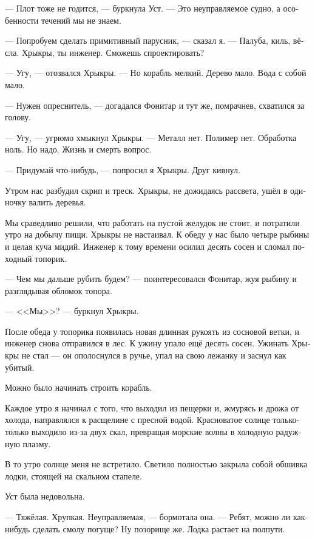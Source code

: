 \documentclass[a4paper,12pt,fleqn]{book}\usepackage{polyglossia}\setdefaultlanguage[babelshorthands=true]{russian}\setotherlanguage{english}\defaultfontfeatures{Ligatures=TeX,Mapping=tex-text}
\newcommand{\asterism}{\vspace{1em}{\centering\Large\bfseries$\ast~\ast~\ast$\par}\vspace{1em}}
\begin{document}
--- Плот тоже не годится, --- буркнула Уст.
--- Это неуправляемое судно, а особенности течений мы не знаем.

--- Попробуем сделать примитивный парусник, --- сказал я.
--- Палуба, киль, вёсла.
Хрыкры, ты инженер.
Сможешь спроектировать?

--- Угу, --- отозвался Хрыкры.
--- Но корабль мелкий.
Дерево мало.
Вода с собой мало.

--- Нужен опреснитель, --- догадался Фонитар и тут же, помрачнев, схватился за голову.

--- Угу, --- угрюмо хмыкнул Хрыкры.
--- Металл нет.
Полимер нет.
Обработка ноль.
Но надо.
Жизнь и смерть вопрос.

--- Придумай что-нибудь, --- попросил я Хрыкры.
Друг кивнул.

\asterism

Утром нас разбудил скрип и треск.
Хрыкры, не дожидаясь рассвета, ушёл в одиночку валить деревья.

Мы сраведливо решили, что работать на пустой желудок не стоит, и потратили утро на добычу пищи.
Хрыкры не настаивал.
К обеду у нас было четыре рыбины и целая куча мидий.
Инженер к тому времени осилил десять сосен и сломал походный топорик.

--- Чем мы дальше рубить будем? --- поинтересовался Фонитар, жуя рыбину и разглядывая обломок топора.

--- <<Мы>>? --- буркнул Хрыкры.

После обеда у топорика появилась новая длинная рукоять из сосновой ветки, и инженер снова отправился в лес.
К ужину упало ещё десять сосен.
Ужинать Хрыкры не стал --- он ополоснулся в ручье, упал на свою лежанку и заснул как убитый.

Можно было начинать строить корабль.

\asterism

Каждое утро я начинал с того, что выходил из пещерки и, жмурясь и дрожа от холода, направлялся к расщелине с пресной водой.
Красноватое солнце только-только выходило из-за двух скал, превращая морские волны в холодную радужную плазму.

В то утро солнце меня не встретило.
Светило полностью закрыла собой обшивка лодки, стоящей на скальном стапеле.

Уст была недовольна.

--- Тяжёлая.
Хрупкая.
Неуправляемая, --- бормотала она.
--- Ребят, можно ли как-нибудь сделать смолу погуще?
Ну позорище же.
Лодка растает на полпути.
\end{document}
